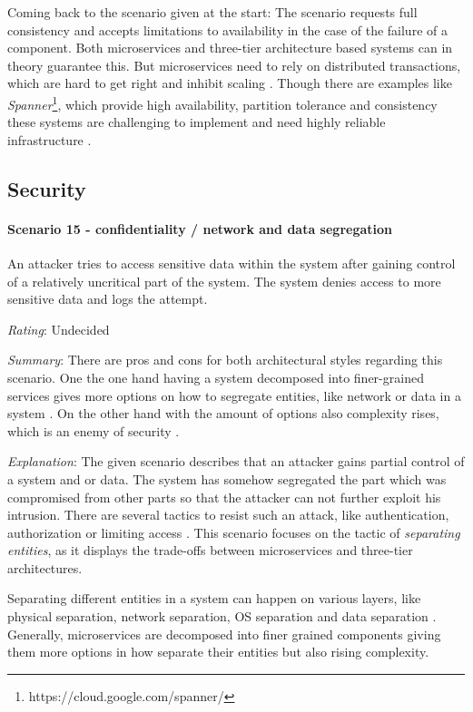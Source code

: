 Coming back to the scenario given at the start:
The scenario requests full consistency and accepts limitations to availability in the case of the failure of a component.
Both microservices and three-tier architecture based systems can in theory guarantee this.
But microservices need to rely on distributed transactions, which are hard to get right and inhibit scaling \citep[p. 93]{Newman2015}.
Though there are examples like \textit{Spanner}\footnote{https://cloud.google.com/spanner/}, which provide high availability, partition tolerance and consistency these systems are challenging to implement and need highly reliable infrastructure \cite{Brewer2017}.

\subsection{Security}
\label{quaMicro:security}
\paragraph{Scenario 15 - confidentiality / network and data segregation}
An attacker tries to access sensitive data within the system after gaining control of a relatively uncritical part of the system. The system denies access to more sensitive data and logs the attempt.
\label{quaMicro:s15}

\textit{Rating}: Undecided

\textit{Summary}:
There are pros and cons for both architectural styles regarding this scenario.
One the one hand having a system decomposed into finer-grained services gives more options on how to segregate entities, like network or data in a system \citep[p. 188]{Newman2015}.
On the other hand with the amount of options also complexity rises, which is an enemy of security \cite{Schneier2000}.

\textit{Explanation}:
The given scenario describes that an attacker gains partial control of a system and or data. 
The system has somehow segregated the part which was compromised from other parts so that the attacker can not further exploit his intrusion.
There are several tactics to resist such an attack, like authentication, authorization or limiting access \citep[p. 152f.]{Bass2012}. 
This scenario focuses on the tactic of \textit{separating entities}, as it displays the trade-offs between microservices and three-tier architectures.

Separating different entities in a system can happen on various layers, like physical separation, network separation, \ac{OS} separation and data separation \citep[p. 153]{Bass2012}.
Generally, microservices are decomposed into finer grained components giving them more options in how separate their entities but also rising complexity.

